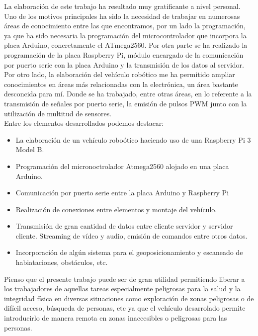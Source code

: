 La elaboración de este trabajo ha resultado muy gratificante a nivel personal. Uno de los motivos principales ha sido la necesidad de trabajar en numerosas áreas de 
conocimiento entre las que encontramos, por un lado la programación, ya que ha sido necesaria la programación del microcontrolador que incorpora la placa Arduino, 
concretamente el ATmega2560. Por otra parte se ha realizado la programación de la placa Raspberry Pi, módulo encargado de la comunicación por puerto serie con la placa Arduino y la 
transmisión de los datos al servidor.\\

Por otro lado, la elaboración del vehículo robótico me ha permitido ampliar conocimientos en áreas más relacionadas con la electrónica, un área bastante desconcida para mí. 
Donde se ha trabajado, entre otras áreas, en lo referente a la transmisión de señales por puerto serie, la emisión de pulsos PWM junto con la utilización de multitud de sensores.\\

Entre los elementos desarrollados podemos destacar:\\

\begin{itemize}
 \item La elaboración de un vehículo roboótico haciendo uso de una Raspberry Pi 3 Model B.
 \item Programación del micronoctrolador Atmega2560 alojado en una placa Arduino.
 \item Comunicación por puerto serie entre la placa Arduino y Raspberry Pi
 \item Realización de conexiones entre elementos y montaje del vehículo.
 \item Transmisión de gran cantidad de datos entre cliente servidor y servidor cliente. Streaming de vídeo y audio, emisión de comandos entre otros datos.\\
 \item Incorporación de algún sistema para el geoposicionamiento y escaneado de habiataciones, obstáculos, etc.
\end{itemize}

Pienso que el presente trabajo puede ser de gran utilidad permitiendo liberar a los trabajadores de aquellas tareas especialmente peligrosas para la salud y la integridad física en diversas situaciones 
como exploración de zonas peligrosas o de difícil acceso, búsqueda de personas, etc ya que el vehículo desarrolado permite introducirlo de manera remota en zonas inaccesibles 
o peligrosas para las personas.\\


